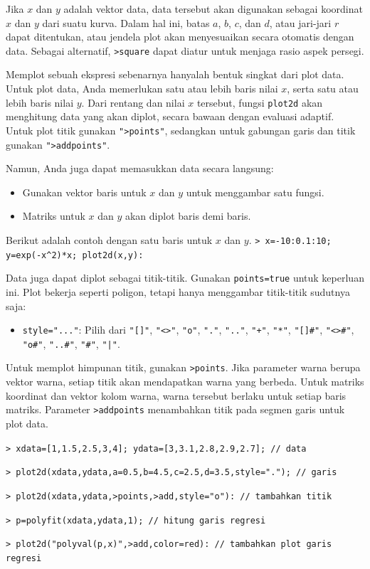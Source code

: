 \documentclass[11pt, a4paper]{article}
\newcommand{\emtcmd}[1]{\noindent\texttt{\textcolor{emtcommand}{>}\ #1}\par\smallskip}
\begin{document}
Jika $x$ dan $y$ adalah vektor data, data tersebut akan digunakan sebagai koordinat $x$ dan $y$ dari suatu kurva. Dalam hal ini, batas $a$, $b$, $c$, dan $d$, atau jari-jari $r$ dapat ditentukan, atau jendela plot akan menyesuaikan secara otomatis dengan data. Sebagai alternatif, \texttt{>square} dapat diatur untuk menjaga rasio aspek persegi.

Memplot sebuah ekspresi sebenarnya hanyalah bentuk singkat dari plot data. Untuk plot data, Anda memerlukan satu atau lebih baris nilai $x$, serta satu atau lebih baris nilai $y$. Dari rentang dan nilai $x$ tersebut, fungsi \texttt{plot2d} akan menghitung data yang akan diplot, secara bawaan dengan evaluasi adaptif. Untuk plot titik gunakan \texttt{">points"}, sedangkan untuk gabungan garis dan titik gunakan \texttt{">addpoints"}.

Namun, Anda juga dapat memasukkan data secara langsung:
\begin{itemize}
    \item Gunakan vektor baris untuk $x$ dan $y$ untuk menggambar satu fungsi.
    \item Matriks untuk $x$ dan $y$ akan diplot baris demi baris.
\end{itemize}

Berikut adalah contoh dengan satu baris untuk $x$ dan $y$.
\emtcmd{x=-10:0.1:10; y=exp(-x\^{}2)*x; plot2d(x,y):}

Data juga dapat diplot sebagai titik-titik. Gunakan \texttt{points=true} untuk keperluan ini. Plot bekerja seperti poligon, tetapi hanya menggambar titik-titik sudutnya saja:
\begin{itemize}
    \item \texttt{style="..."}: Pilih dari \texttt{"[]"}, \texttt{"<>"}, \texttt{"o"}, \texttt{"."}, \texttt{".."}, \texttt{"+"}, \texttt{"*"}, \texttt{"[]\#"}, \texttt{"<>\#"}, \texttt{"o\#"}, \texttt{"..\#"}, \texttt{"\#"}, \texttt{"|"}.
\end{itemize}

Untuk memplot himpunan titik, gunakan \texttt{>points}. Jika parameter warna berupa vektor warna, setiap titik akan mendapatkan warna yang berbeda. Untuk matriks koordinat dan vektor kolom warna, warna tersebut berlaku untuk setiap baris matriks. Parameter \texttt{>addpoints} menambahkan titik pada segmen garis untuk plot data.

\emtcmd{xdata=[1,1.5,2.5,3,4]; ydata=[3,3.1,2.8,2.9,2.7]; \textcolor{emtcomment}{// data}}
\emtcmd{plot2d(xdata,ydata,a=0.5,b=4.5,c=2.5,d=3.5,style="."); \textcolor{emtcomment}{// garis}}
\emtcmd{plot2d(xdata,ydata,>points,>add,style="o"): \textcolor{emtcomment}{// tambahkan titik}}
\emtcmd{p=polyfit(xdata,ydata,1); \textcolor{emtcomment}{// hitung garis regresi}}
\emtcmd{plot2d("polyval(p,x)",>add,color=red): \textcolor{emtcomment}{// tambahkan plot garis regresi}}
\end{document}
